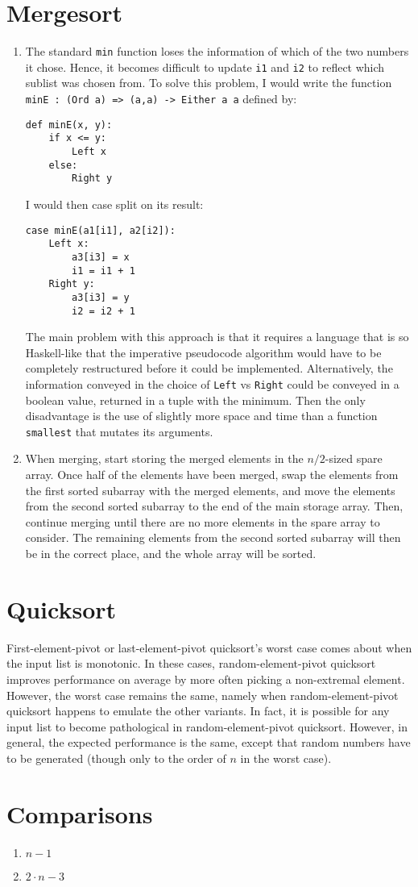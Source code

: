 \documentclass[11pt]{article}
\begin{document}
\section{Mergesort}
\begin{enumerate}
  \item
    The standard \texttt{min} function loses the information of which of the two numbers it chose. Hence, it becomes difficult to update \texttt{i1} and \texttt{i2} to reflect which sublist was chosen from. To solve this problem, I would write the function \texttt{minE : (Ord a) => (a,a) -> Either a a} defined by:
    \begin{lstlisting}
def minE(x, y):
    if x <= y:
        Left x
    else:
        Right y
    \end{lstlisting}
    I would then case split on its result:
    \begin{lstlisting}
case minE(a1[i1], a2[i2]):
    Left x:
        a3[i3] = x
        i1 = i1 + 1
    Right y:
        a3[i3] = y
        i2 = i2 + 1
    \end{lstlisting}
    The main problem with this approach is that it requires a language that is so Haskell-like that the imperative pseudocode algorithm would have to be completely restructured before it could be implemented. Alternatively, the information conveyed in the choice of \texttt{Left} vs \texttt{Right} could be conveyed in a boolean value, returned in a tuple with the minimum. Then the only disadvantage is the use of slightly more space and time than a function \texttt{smallest} that mutates its arguments.
  \item
    When merging, start storing the merged elements in the \(n/2\)-sized spare array. Once half of the elements have been merged, swap the elements from the first sorted subarray with the merged elements, and move the elements from the second sorted subarray to the end of the main storage array. Then, continue merging until there are no more elements in the spare array to consider. The remaining elements from the second sorted subarray will then be in the correct place, and the whole array will be sorted.
\end{enumerate}

\section{Quicksort}
First-element-pivot or last-element-pivot quicksort's worst case comes about when the input list is monotonic. In these cases, random-element-pivot quicksort improves performance on average by more often picking a non-extremal element. However, the worst case remains the same, namely when random-element-pivot quicksort happens to emulate the other variants. In fact, it is possible for any input list to become pathological in random-element-pivot quicksort. However, in general, the expected performance is the same, except that random numbers have to be generated (though only to the order of \(n\) in the worst case).

\section{Comparisons}
\begin{enumerate}
  \item \(n - 1\)
  \item \(2 \cdot n - 3\)
\end{enumerate}
\end{document}

